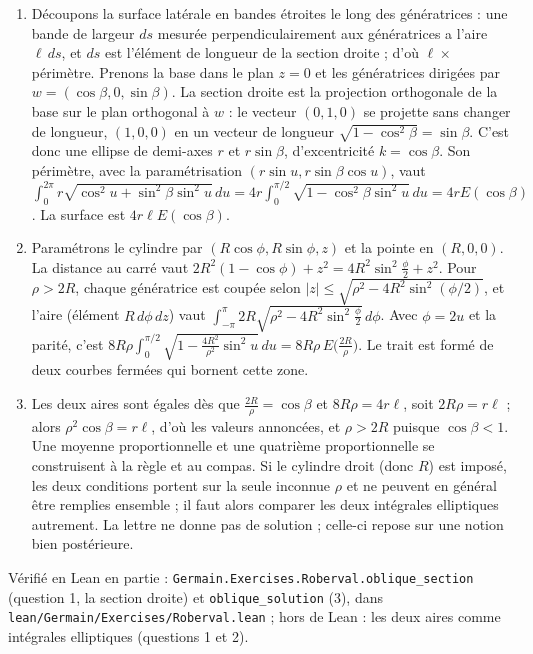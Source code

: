 \documentclass[11pt,a4paper]{article}
\begin{document}
\begin{solution}
\begin{enumerate}
\item Découpons la surface latérale en bandes étroites le long des génératrices :
  une bande de largeur $ds$ mesurée perpendiculairement aux génératrices a l'aire
  $\ell\,ds$, et $ds$ est l'élément de longueur de la section droite ; d'où
  $\ell\times$ périmètre. Prenons la base dans le plan $z = 0$ et les génératrices
  dirigées par $w = (\cos\beta, 0, \sin\beta)$. La section droite est la projection
  orthogonale de la base sur le plan orthogonal à $w$ : le vecteur $(0, 1, 0)$ se
  projette sans changer de longueur, $(1, 0, 0)$ en un vecteur de longueur
  $\sqrt{1 - \cos^2\beta} = \sin\beta$. C'est donc une ellipse de demi-axes $r$ et
  $r\sin\beta$, d'excentricité $k = \cos\beta$. Son périmètre, avec la
  paramétrisation $(r\sin u, r\sin\beta\cos u)$, vaut
  $\int_0^{2\pi} r\sqrt{\cos^2u + \sin^2\beta\sin^2u}\,du = 4r\int_0^{\pi/2}
  \sqrt{1 - \cos^2\beta\sin^2u}\,du = 4rE(\cos\beta)$. La surface est
  $4r\ell E(\cos\beta)$.
\item Paramétrons le cylindre par $(R\cos\phi, R\sin\phi, z)$ et la pointe en
  $(R, 0, 0)$. La distance au carré vaut $2R^2(1 - \cos\phi) + z^2 =
  4R^2\sin^2\frac{\phi}{2} + z^2$. Pour $\rho > 2R$, chaque génératrice est coupée
  selon $|z| \le \sqrt{\rho^2 - 4R^2\sin^2(\phi/2)}$, et l'aire (élément
  $R\,d\phi\,dz$) vaut
  $\int_{-\pi}^{\pi} 2R\sqrt{\rho^2 - 4R^2\sin^2\frac\phi2}\,d\phi$. Avec
  $\phi = 2u$ et la parité, c'est
  $8R\rho\int_0^{\pi/2}\sqrt{1 - \frac{4R^2}{\rho^2}\sin^2u}\,du =
  8R\rho\,E\bigl(\frac{2R}{\rho}\bigr)$. Le trait est formé de deux courbes fermées
  qui bornent cette zone.
\item Les deux aires sont égales dès que $\frac{2R}{\rho} = \cos\beta$ et
  $8R\rho = 4r\ell$, soit $2R\rho = r\ell$ ; alors $\rho^2\cos\beta = r\ell$, d'où
  les valeurs annoncées, et $\rho > 2R$ puisque $\cos\beta < 1$. Une moyenne
  proportionnelle et une quatrième proportionnelle se construisent à la règle et
  au compas. Si le cylindre droit (donc $R$) est imposé, les deux conditions
  portent sur la seule inconnue $\rho$ et ne peuvent en général être remplies
  ensemble ; il faut alors comparer les deux intégrales elliptiques autrement. La
  lettre ne donne pas de solution ; celle-ci repose sur une notion bien
  postérieure.
\end{enumerate}

Vérifié en Lean en partie : \texttt{Germain.Exercises.Roberval.oblique\_section} (question 1,
la section droite) et \texttt{oblique\_solution} (3), dans \texttt{lean/Germain/Exercises/Roberval.lean} ; hors de Lean :
les deux aires comme intégrales elliptiques (questions 1 et 2).
\end{solution}
\end{document}
